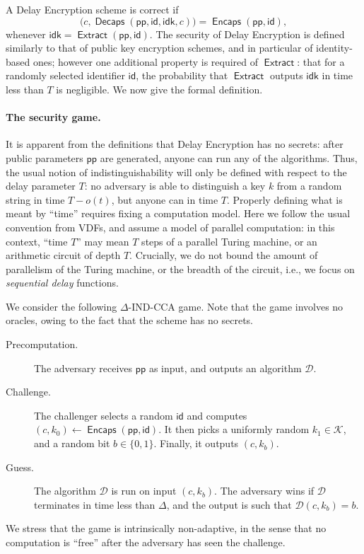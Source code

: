 \documentclass{llncs}
\DeclareMathOperator{\Extract}{\mathsf{Extract}}
\DeclareMathOperator{\Encaps}{\mathsf{Encaps}}
\DeclareMathOperator{\Decaps}{\mathsf{Decaps}}
\newcommand{\pp}{\mathsf{pp}}
\newcommand{\id}{\mathsf{id}}
\newcommand{\idk}{\mathsf{idk}}
\newcommand{\keyspace}{\mathcal{K}}
\begin{document}
A Delay Encryption scheme is correct if
\[\bigl(c,\Decaps(\pp,\id,\idk,c)\bigr) = \Encaps(\pp,\id),\]
whenever $\idk=\Extract(\pp,\id)$. %
The security of Delay Encryption is defined similarly to that of
public key encryption schemes, and in particular of identity-based
ones; however one additional property is required of $\Extract$: that
for a randomly selected identifier $\id$, the probability that
$\Extract$ outputs $\idk$ in time less than $T$ is negligible. %
We now give the formal definition.

\paragraph{The security game.} It is apparent from the definitions
that Delay Encryption has no secrets: after public parameters $\pp$
are generated, anyone can run any of the algorithms. %
Thus, the usual notion of indistinguishability will only be defined
with respect to the delay parameter $T$: no adversary is able to
distinguish a key $k$ from a random string in time $T-o(t)$, but
anyone can in time $T$. %
Properly defining what is meant by ``time'' requires fixing a
computation model. %
Here we follow the usual convention from VDFs, and assume a model of
parallel computation: in this context, ``time $T$'' may mean $T$ steps
of a parallel Turing machine, or an arithmetic circuit of depth $T$. %
Crucially, we do not bound the amount of parallelism of the Turing
machine, or the breadth of the circuit, i.e., we focus on
\emph{sequential delay} functions.

We consider the following $\Delta$-IND-CCA game. %
Note that the game involves no oracles, owing to the fact that the
scheme has no secrets. %
%
\begin{description}
\item[Precomputation.] The adversary receives $\pp$ as input, and
  outputs an algorithm $\mathcal{D}$. %
\item[Challenge.] The challenger selects a random $\id$ and computes
  $(c,k_0)\gets\Encaps(\pp,\id)$. %
  It then picks a uniformly random $k_1\in\keyspace$, and a random bit
  $b\in\{0,1\}$. %
  Finally, it outputs $(c,k_b)$.
\item[Guess.] The algorithm $\mathcal{D}$ is run on input
  $(c,k_b)$. %
  The adversary wins if $\mathcal{D}$ terminates in time less than
  $\Delta$, and the output is such that $\mathcal{D}(c,k_b) = b$.
\end{description}

We stress that the game is intrinsically non-adaptive, in the sense
that no computation is ``free'' after the adversary has seen the
challenge.
\end{document}
